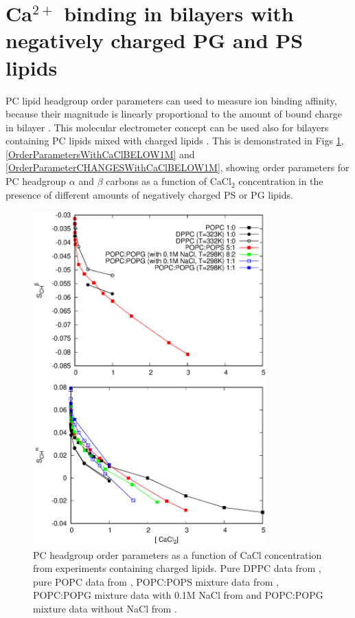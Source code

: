 \documentclass[aps,prl,superscriptaddress,twocolumn]{revtex4}
\begin{document}
\section{Ca$^{2+}$ binding in bilayers with negatively charged PG and PS lipids}

PC lipid headgroup order parameters can used to measure ion binding
affinity, because their magnitude is linearly proportional
to the amount of bound charge in bilayer \cite{seelig87,catte16}.
This molecular electrometer concept can be used also
for bilayers containing PC lipids mixed with charged lipids \cite{borle85,macdonald87,roux90}.
This is demonstrated in Figs \ref{OrderParametersWithCaCl},
\ref{OrderParametersWithCaClBELOW1M} and \ref{OrderParameterCHANGESWithCaClBELOW1M},
showing order parameters for PC headgroup $\alpha$ and $\beta$ carbons
as a function of CaCl$_2$ concentration in the presence of different amounts of
negatively charged PS or PG lipids.
\begin{figure}[]
  \centering
  \includegraphics[width=9.0cm]{../Figs/LIPIDSwithCaCl.eps}
  \caption{\label{OrderParametersWithCaCl}
    PC headgroup order parameters as a function of CaCl concentration from experiments containing charged lipids.
    Pure DPPC data from \cite{akutsu81}, pure POPC data from \cite{altenbach84}, 
    POPC:POPS mixture data from \cite{roux90}, POPC:POPG mixture data with 0.1M NaCl from \cite{macdonald87}
    and POPC:POPG mixture data without NaCl from \cite{borle85}.
  }
\end{figure}
\end{document}
